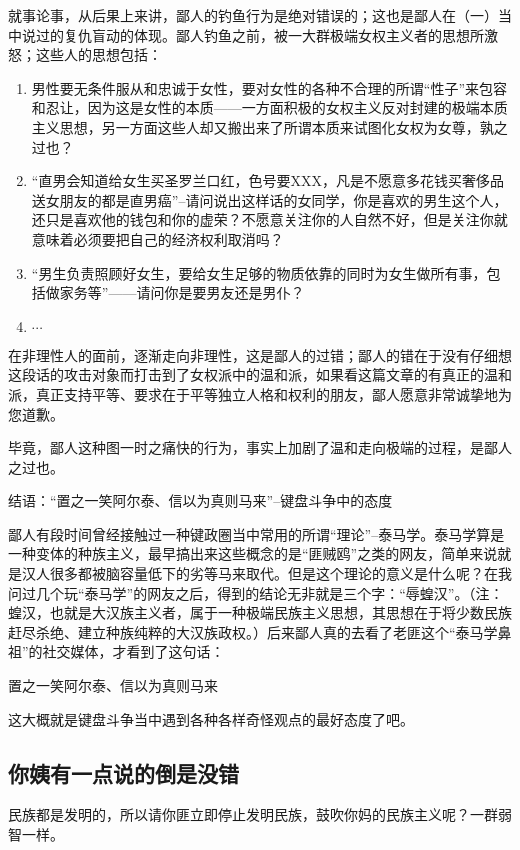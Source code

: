 \documentclass{ctexart}
\begin{document}
\begin{itemize}
	就事论事，从后果上来讲，鄙人的钓鱼行为是绝对错误的；这也是鄙人在（一）当中说过的复仇盲动的体现。鄙人钓鱼之前，被一大群极端女权主义者的思想所激怒；这些人的思想包括：
	\begin{enumerate}
		\item 	男性要无条件服从和忠诚于女性，要对女性的各种不合理的所谓“性子”来包容和忍让，因为这是女性的本质——一方面积极的女权主义反对封建的极端本质主义思想，另一方面这些人却又搬出来了所谓本质来试图化女权为女尊，孰之过也？
		\item “直男会知道给女生买圣罗兰口红，色号要XXX，凡是不愿意多花钱买奢侈品送女朋友的都是直男癌”--请问说出这样话的女同学，你是喜欢的男生这个人，还只是喜欢他的钱包和你的虚荣？不愿意关注你的人自然不好，但是关注你就意味着必须要把自己的经济权利取消吗？
		\item “男生负责照顾好女生，要给女生足够的物质依靠的同时为女生做所有事，包括做家务等”——请问你是要男友还是男仆？
		\item $\cdots$
	\end{enumerate}
	
	在非理性人的面前，逐渐走向非理性，这是鄙人的过错；鄙人的错在于没有仔细想这段话的攻击对象而打击到了女权派中的温和派，如果看这篇文章的有真正的温和派，真正支持平等、要求在于平等独立人格和权利的朋友，鄙人愿意非常诚挚地为您道歉。
	
	毕竟，鄙人这种图一时之痛快的行为，事实上加剧了温和走向极端的过程，是鄙人之过也。
	
	结语：“置之一笑阿尔泰、信以为真则马来”--键盘斗争中的态度
	
	鄙人有段时间曾经接触过一种键政圈当中常用的所谓“理论”--泰马学。泰马学算是一种变体的种族主义，最早搞出来这些概念的是“匪贼鸥”之类的网友，简单来说就是汉人很多都被脑容量低下的劣等马来取代。但是这个理论的意义是什么呢？在我问过几个玩“泰马学”的网友之后，得到的结论无非就是三个字：“辱蝗汉”。（注：蝗汉，也就是大汉族主义者，属于一种极端民族主义思想，其思想在于将少数民族赶尽杀绝、建立种族纯粹的大汉族政权。）后来鄙人真的去看了老匪这个“泰马学鼻祖”的社交媒体，才看到了这句话：
	
	置之一笑阿尔泰、信以为真则马来
	
	这大概就是键盘斗争当中遇到各种各样奇怪观点的最好态度了吧。
	\end{itemize}

	\subsection{你姨有一点说的倒是没错}
	
	民族都是发明的，所以请你匪立即停止发明民族，鼓吹你妈的民族主义呢？一群弱智一样。
	
\end{document}
